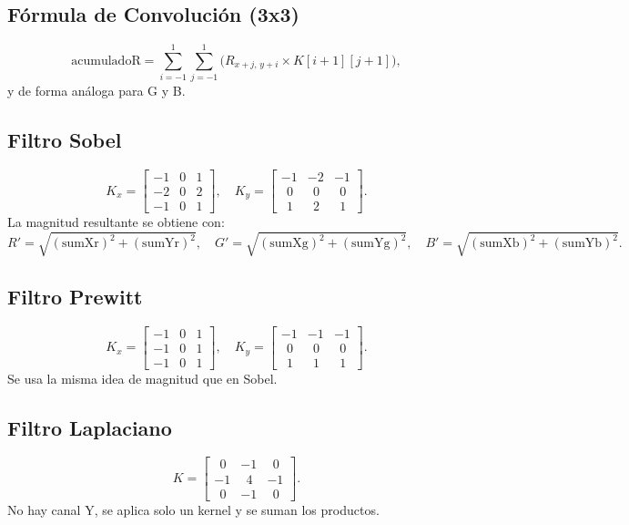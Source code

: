 \documentclass[11pt]{article}
\begin{document}
\subsection{Fórmula de Convolución (3x3)}
\[
\text{acumuladoR} = \sum_{i=-1}^{1} \sum_{j=-1}^{1} \bigl(R_{x+j,\,y+i} \times K[i+1][j+1]\bigr),
\]
y de forma análoga para G y B.

\subsection{Filtro Sobel}
\[
K_x = 
\begin{bmatrix}
-1 & 0 & 1\\
-2 & 0 & 2\\
-1 & 0 & 1
\end{bmatrix},
\quad
K_y =
\begin{bmatrix}
-1 & -2 & -1\\
\;\,0 & \;\,0 & \;\,0\\
\;\,1 & \;\,2 & \;\,1
\end{bmatrix}.
\]
La magnitud resultante se obtiene con:
\[
R' = \sqrt{( \text{sumXr} )^2 + ( \text{sumYr} )^2},
\quad
G' = \sqrt{( \text{sumXg} )^2 + ( \text{sumYg} )^2},
\quad
B' = \sqrt{( \text{sumXb} )^2 + ( \text{sumYb} )^2}.
\]

\subsection{Filtro Prewitt}
\[
K_x = 
\begin{bmatrix}
-1 & 0 & 1\\
-1 & 0 & 1\\
-1 & 0 & 1
\end{bmatrix},
\quad
K_y =
\begin{bmatrix}
-1 & -1 & -1\\
\;\,0 & \;\,0 & \;\,0\\
\;\,1 & \;\,1 & \;\,1
\end{bmatrix}.
\]
Se usa la misma idea de magnitud que en Sobel.

\subsection{Filtro Laplaciano}
\[
K =
\begin{bmatrix}
\;\,0 & -1 & \;\,0\\
-1 & \;\,4 & -1\\
\;\,0 & -1 & \;\,0
\end{bmatrix}.
\]
No hay canal Y, se aplica solo un kernel y se suman los productos.
\end{document}
